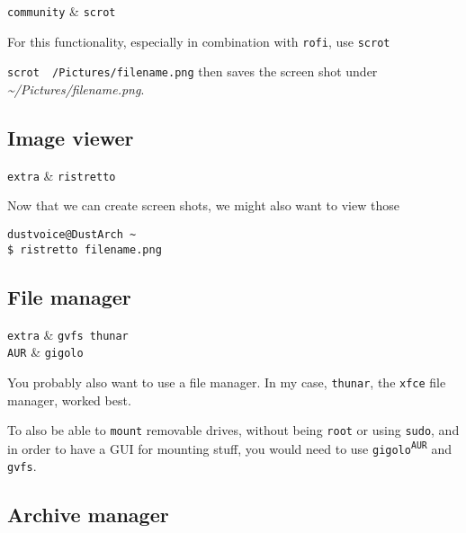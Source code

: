 \documentclass[10pt]{dustdoc}
\begin{document}
\begin{packagetable}
    \texttt{community} & \texttt{scrot} \\ 
\end{packagetable}

For this functionality, especially in combination with \texttt{rofi}, use \texttt{scrot}

\texttt{scrot ~/Pictures/filename.png} then saves the screen shot under \textit{\~{}/Pictures/filename.png}.

\subsection{Image viewer}
\label{sec:image-viewer}

\begin{packagetable}
    \texttt{extra} & \texttt{ristretto} \\ 
\end{packagetable}

Now that we can create screen shots, we might also want to view those

\begin{verbatim}
dustvoice@DustArch ~
$ ristretto filename.png
\end{verbatim}

\subsection{File manager}
\label{sec:file-manager}

\begin{packagetable}
    \texttt{extra} & \texttt{gvfs thunar} \\ 
    \texttt{AUR} & \texttt{gigolo} \\ 
\end{packagetable}

You probably also want to use a file manager.
In my case, \texttt{thunar}, the \texttt{xfce} file manager, worked best.

To also be able to \texttt{mount} removable drives, without being \texttt{root} or using \texttt{sudo}, and in order to have a GUI for mounting stuff, you would need to use \texttt{gigolo\textsuperscript{\texttt{AUR}}} and \texttt{gvfs}.

\subsection{Archive manager}
\label{sec:archive-manager}
\end{document}
